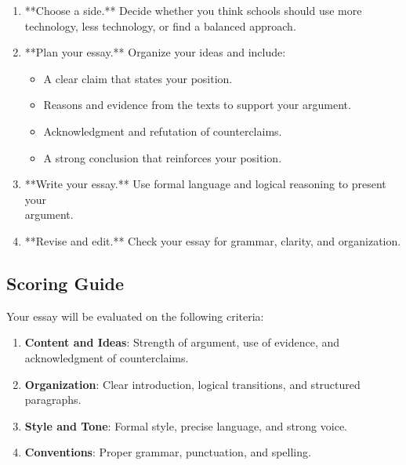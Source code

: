 \documentclass[12pt]{article}
\begin{document}
\begin{enumerate}
    \item **Choose a side.** Decide whether you think schools should use more \\technology, less technology, or find a balanced approach.
    \item **Plan your essay.** Organize your ideas and include:
    \begin{itemize}
        \item A clear claim that states your position.
        \item Reasons and evidence from the texts to support your argument.
        \item Acknowledgment and refutation of counterclaims.
        \item A strong conclusion that reinforces your position.
    \end{itemize}
    \item **Write your essay.** Use formal language and logical reasoning to present your \\argument.
    \item **Revise and edit.** Check your essay for grammar, clarity, and organization.
\end{enumerate}

\subsection*{Scoring Guide}

Your essay will be evaluated on the following criteria:
\begin{enumerate}
    \item \textbf{Content and Ideas}: Strength of argument, use of evidence, and acknowledgment of counterclaims.
    \item \textbf{Organization}: Clear introduction, logical transitions, and structured paragraphs.
    \item \textbf{Style and Tone}: Formal style, precise language, and strong voice.
    \item \textbf{Conventions}: Proper grammar, punctuation, and spelling.
\end{enumerate}
\end{document}
